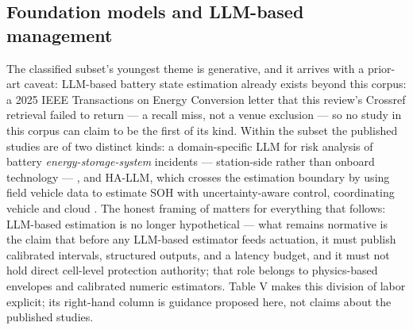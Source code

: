 \documentclass[journal]{IEEEtran}
\begin{document}
\subsection{Foundation models and LLM-based management}

The classified subset's youngest theme is generative, and it arrives with a prior-art caveat: LLM-based battery state estimation already exists beyond this corpus: a 2025 IEEE Transactions on Energy Conversion letter \cite{r29} that this review's Crossref retrieval failed to return --- a recall miss, not a venue exclusion --- so no study in this corpus can claim to be the first of its kind. Within the subset the published studies are of two distinct kinds: a domain-specific LLM for risk analysis of battery \textit{energy-storage-system} incidents --- station-side rather than onboard technology --- \cite{r14}, and HA-LLM, which crosses the estimation boundary by using field vehicle data to estimate SOH with uncertainty-aware control, coordinating vehicle and cloud \cite{r15}. The honest framing of \cite{r15} matters for everything that follows: LLM-based estimation is no longer hypothetical --- what remains normative is the claim that before any LLM-based estimator feeds actuation, it must publish calibrated intervals, structured outputs, and a latency budget, and it must not hold direct cell-level protection authority; that role belongs to physics-based envelopes and calibrated numeric estimators. Table V makes this division of labor explicit; its right-hand column is guidance proposed here, not claims about the published studies.
\end{document}
